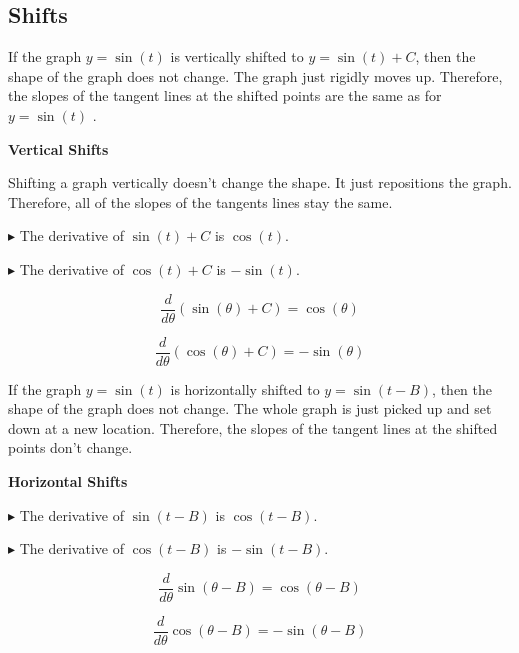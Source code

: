 \documentclass{ximera}
\begin{document}
\subsection*{Shifts}




If the graph $y = \sin(t)$ is vertically shifted to $y = \sin(t)+C$, then the shape of the graph does not change. The graph just rigidly moves up. Therefore, the slopes of the tangent lines at the shifted points are the same as for $y = \sin(t)$ .



\begin{observation} \textbf{\textcolor{-red!75}{Vertical Shifts}}  

Shifting a graph vertically doesn't change the shape.  It just repositions the graph.  Therefore, all of the slopes of the tangents lines stay the same. 



$\blacktriangleright$ The derivative of $\sin(t)+C$ is $\cos(t)$. 

$\blacktriangleright$ The derivative of $\cos(t)+C$ is $-\sin(t)$. 

\end{observation}


\begin{notation}

\[
\frac{d}{d\theta} (\sin(\theta) + C) = \cos(\theta)
\]

\[
\frac{d}{d\theta} (\cos(\theta) + C) = -\sin(\theta)
\]

\end{notation}


If the graph $y = \sin(t)$ is horizontally shifted to $y = \sin(t - B)$, then the shape of the graph does not change. The whole graph is just picked up and set down at a new location. Therefore, the slopes of the tangent lines at the shifted points don't change.



\begin{observation} \textbf{\textcolor{-red!75}{Horizontal Shifts}} 

$\blacktriangleright$ The derivative of $\sin(t - B)$ is $\cos(t - B)$. 

$\blacktriangleright$ The derivative of $\cos(t - B)$ is $-\sin(t - B)$. 

\end{observation}


\begin{notation}

\[
\frac{d}{d\theta} \sin(\theta - B) = \cos(\theta - B)
\]

\[
\frac{d}{d\theta} \cos(\theta - B) = -\sin(\theta - B)
\]

\end{notation}
\end{document}
